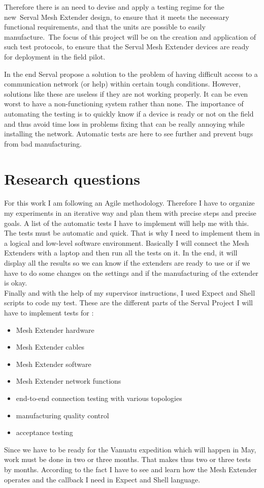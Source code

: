Therefore there is an need to devise and apply a testing regime for the new Serval Mesh Extender design, to ensure that it meets the necessary functional requirements, and that the units are possible to easily manufacture. The focus of this project will be on the creation and application of such test protocols, to ensure that the Serval Mesh Extender devices are ready for deployment in the field pilot.
\par
In the end Serval propose a solution to the problem of having difficult access to a communication network (or help) within certain tough conditions. However, solutions like these are useless if they are not working properly. It can be even worst to have a non-functioning system rather than none. The importance of automating the testing is to quickly know if a device is ready or not on the field and thus avoid time loss in problems fixing that can be really annoying while installing the network. Automatic tests are here to see further and prevent bugs from bad manufacturing.

\section{Research questions}
For this work I am following an Agile methodology. Therefore I have to organize my experiments in an iterative way and plan them with precise steps and precise goals. A list of the automatic tests I have to implement will help me with this. \\
The tests must be automatic and quick. That is why I need to implement them in a logical and low-level software environment. Basically I will connect the Mesh Extenders with a laptop and then run all the tests on it. In the end, it will display all the results so we can know if the extenders are ready to use or if we have to do some changes on the settings and if the manufacturing of the extender is okay. \\
Finally and with the help of my supervisor instructions, I used Expect and Shell scripts to code my test. 
These are the different parts of the Serval Project I will have to implement tests for : 
\begin{itemize}
\item Mesh Extender hardware 
\item Mesh Extender cables
\item Mesh Extender software 
\item Mesh Extender network functions
\item end-to-end connection testing with various topologies
\item manufacturing quality control 
\item acceptance testing
\end{itemize}
Since we have to be ready for the Vanuatu expedition which will happen in May, work must be done in two or three months. That makes thus two or three tests by months. According to the fact I have to see and learn how the Mesh Extender operates and the callback I need in Expect and Shell language. 


